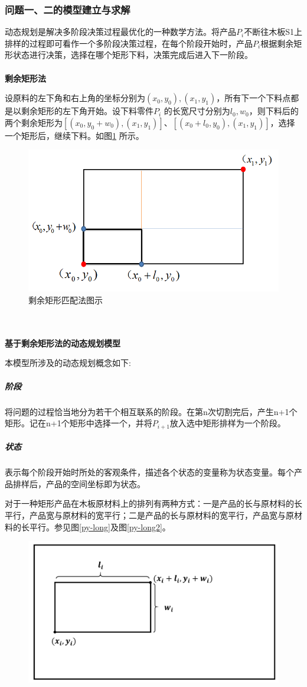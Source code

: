 \documentclass[hyperref,UTF8]{article}
\begin{document}
{\subsubsection{问题一、二的模型建立与求解}
动态规划是解决多阶段决策过程最优化的一种数学方法。将产品$P_i$不断往木板S1上排样的过程即可看作一个多阶段决策过程，在每个阶段开始时，产品$P_i$根据剩余矩形状态进行决策，选择在哪个矩形下料，决策完成后进入下一阶段。\\
\ \\
\textbf{剩余矩形法}\par
设原料的左下角和右上角的坐标分别为$(x_0,y_0),(x_1,y_1)$，所有下一个下料点都是以剩余矩形的左下角开始。设下料零件$P_i$ 的长宽尺寸分别为$l_0,w_0$，则下料后的两个剩余矩形为$[ (x_0,y_0+w_0),(x_1,y_1)]$、$[(x_0+l_0,y_0),(x_1,y_1)]$，选择一个矩形后，继续下料。如图\ref{shengyujuxing}
所示\cite{1}。
\begin{figure}[htbp]
  \centering
  \includegraphics[width=.8\textwidth]{picture/PIC}
  \caption{剩余矩形匹配法图示}\label{shengyujuxing}
\end{figure}\\
\ \\
\textbf{基于剩余矩形法的动态规划模型}\par
本模型所涉及的动态规划概念如下:
\subparagraph{阶段}
将问题的过程恰当地分为若干个相互联系的阶段。在第n次切割完后，产生n+1个矩形。记在n+1个矩形中选择一个，并将$P_{i+1}$放入选中矩形排样为一个阶段。
\subparagraph{状态}
表示每个阶段开始时所处的客观条件，描述各个状态的变量称为状态变量。每个产品排样后，产品的空间坐标即为状态。\par
对于一种矩形产品在木板原材料上的排列有两种方式：一是产品的长与原材料的长平行，产品宽与原材料的宽平行；二是产品的长与原材料的宽平行，产品宽与原材料的长平行。参见图\ref{py-long}及图\ref{py-long2}。\par
\begin{figure}[htbp]
  \centering
  \includegraphics[width=.7\textwidth]{picture/PPT1}

\end{figure}}
\end{document}
